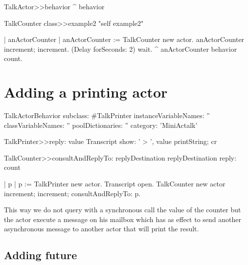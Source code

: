 \documentclass[a4paper,10pt,twoside]{book}
\begin{document}
\begin{method}{}
TalkActor>>behavior
	^ behavior
\end{method}

\begin{method}{}
TalkCounter class>>example2
	"self example2"
	
	| anActorCounter |
	anActorCounter := TalkCounter new actor.
	anActorCounter increment; increment.
	(Delay forSeconds: 2) wait.
	^ anActorCounter behavior count. 
\end{method}

\section{Adding a printing actor}
\begin{classdef}{}
TalkActorBehavior subclass: #TalkPrinter
	instanceVariableNames: ''
	classVariableNames: ''
	poolDictionaries: ''
	category: 'MiniActalk'
\end{classdef}


\begin{method}{}
TalkPrinter>>reply: value
	Transcript show: ' > ', value printString; cr  
\end{method}

\begin{method}{}
TalkCounter>>consultAndReplyTo: replyDestination
	replyDestination reply: count
\end{method}


\begin{code}{}
| p |
	p := TalkPrinter new actor. 
	Transcript open.
	TalkCounter new actor
		increment; increment; consultAndReplyTo: p.
\end{code}

This way we do not query with a synchronous call the value of the counter
but the actor execute a message on his mailbox which has as effect to 
send another asynchronous message to another actor that will print the result. 
	
\subsection{Adding future}


\ifx\wholebook\relax\else
\end{document}
